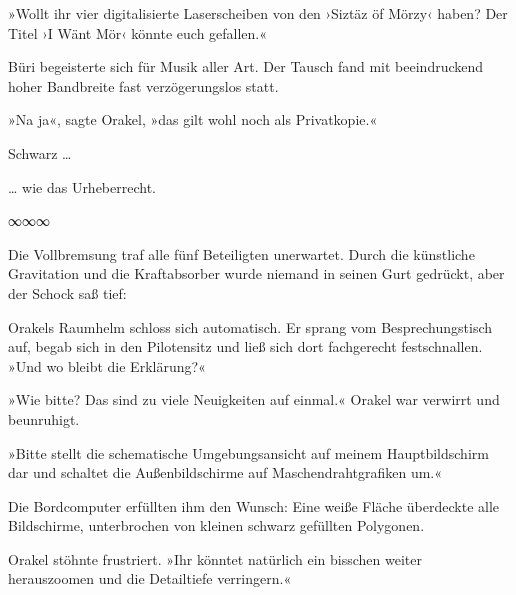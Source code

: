 »Wollt ihr vier digitalisierte Laserscheiben von den ›Siztäz öf Mörzy‹ haben? Der Titel ›I Wänt Mör‹ könnte euch gefallen.«

Büri begeisterte sich für Musik aller Art.  Der Tausch fand mit beeindruckend hoher Bandbreite fast verzögerungslos statt. 

»Na ja«, sagte Orakel, »das gilt wohl noch als Privatkopie.«

Schwarz …

\begin{flushright}
… wie das Urheberrecht.
\end{flushright}

\begin{center}
∞∞∞
\end{center}

Die Vollbremsung traf alle fünf Beteiligten unerwartet. Durch die künstliche Gravitation und die Kraftabsorber wurde niemand in seinen Gurt gedrückt, aber der Schock saß tief: 

Orakels Raumhelm schloss sich automatisch. Er sprang vom Besprechungstisch auf, begab sich in den Pilotensitz und ließ sich dort fachgerecht festschnallen. »Und wo bleibt die Erklärung?«


»Wie bitte? Das sind zu viele Neuigkeiten auf einmal.« Orakel war verwirrt und beunruhigt.


»Bitte stellt die schematische Umgebungsansicht auf meinem Hauptbildschirm dar und schaltet die Außenbildschirme auf Maschendrahtgrafiken um.«

Die Bordcomputer erfüllten ihm den Wunsch: Eine weiße Fläche überdeckte alle Bildschirme, unterbrochen von kleinen schwarz gefüllten Polygonen. 

Orakel stöhnte frustriert. »Ihr könntet natürlich ein bisschen weiter herauszoomen und die Detailtiefe verringern.«

